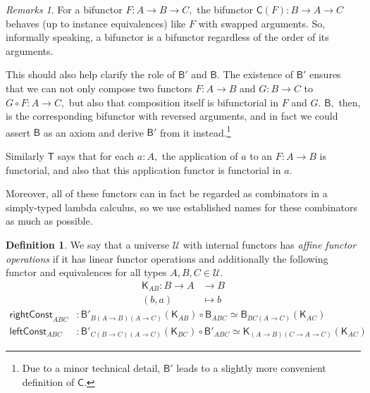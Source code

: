 \documentclass[a4paper]{article}
\theoremstyle{definition}
\newtheorem{definition}{Definition}[section]
\theoremstyle{remark}
\newtheorem*{remarks}{Remarks}
\newcommand{\defn}{\emph}
\renewcommand{\equiv}{\simeq}
\newcommand{\U}{\mathcal{U}}
\newcommand{\nm}{\mathsf}
\newcommand{\combinator}{\nm}
\newcommand{\appFun}{\combinator{T}}
\newcommand{\constFun}{\combinator{K}}
\newcommand{\compFun}{\combinator{B'}}
\newcommand{\revCompFun}{\combinator{B}}
\newcommand{\swapFun}{\combinator{C}}
\begin{document}
\begin{remarks}
  For a bifunctor $F : A \to B \to C,$ the bifunctor $\swapFun(F) : B \to A \to C$ behaves
  (up to instance equivalences) like $F$ with swapped arguments. So, informally speaking,
  a bifunctor is a bifunctor regardless of the order of its arguments.

  This should also help clarify the role of $\compFun$ and $\revCompFun.$ The existence
  of $\compFun$ ensures that we can not only compose two functors $F : A \to B$ and
  $G : B \to C$ to $G \circ F : A \to C,$ but also that composition itself is bifunctorial
  in $F$ and $G.$ $\revCompFun,$ then, is the corresponding bifunctor with reversed
  arguments, and in fact we could assert $\revCompFun$ as an axiom and derive $\compFun$
  from it instead.\footnote{Due to a minor technical detail, $\compFun$ leads to a slightly
  more convenient definition of $\swapFun.$}

  Similarly $\appFun$ says that for each $a : A,$ the application of $a$ to an
  $F : A \to B$ is functorial, and also that this application functor is functorial in
  $a.$

  Moreover, all of these functors can in fact be regarded as combinators\cite{combinators}
  in a simply-typed lambda calculus\cite{simply-typed-lambda-calculus}, so we use
  established names for these combinators as much as possible.
\end{remarks}

\vspace{1ex}
\begin{definition}
  We say that a universe $\U$ with internal functors has \defn{affine functor
  operations} if it has linear functor operations and additionally the following functor
  and equivalences for all types $A,B,C \in \U.$
  \begin{align*}
    \constFun_{AB} : B \to A &\to     B\\
                     (b,a)   &\mapsto b
  \end{align*}
  \begin{align*}
    \nm{rightConst}_{ABC} &: \compFun_{B(A{\to}B)(A{\to}C)}(\constFun_{AB}) \circ \revCompFun_{ABC} \equiv \revCompFun_{BC(A{\to}C)}(\constFun_{AC})\\
    \nm{leftConst}_{ABC}  &: \compFun_{C(B{\to}C)(A{\to}C)}(\constFun_{BC}) \circ \compFun_{ABC} \equiv \constFun_{(A{\to}B)(C{\to}A{\to}C)}(\constFun_{AC})
  \end{align*}
\end{definition}
\end{document}
